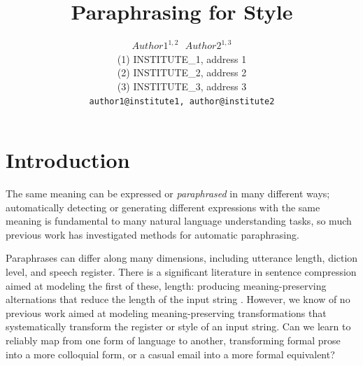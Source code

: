 \documentclass[10pt,a5paper,twoside]{article}
\title{Paraphrasing for Style}
\author{$Author1^{1, 2}~~~Author2^{1, 3}$\\
{\small  	(1) INSTITUTE\_1, address 1\\ 
 		(2) INSTITUTE\_2, address 2\\
		(3) INSTITUTE\_3, address 3\\
  \texttt{author1@institute1, author@institute2} \\ 
}}
\begin{document}
\maketitle


\newpage
\section{Introduction}

The same meaning can be expressed or \emph{paraphrased} in many different ways; automatically detecting or generating different expressions with the same meaning is 
fundamental to many natural language understanding tasks\cite{Giampiccolo07}, so much previous work has investigated methods for automatic paraphrasing\cite{Barzilay03,dolan04,Shinyama03,Das09,bannard05}.  

Paraphrases can differ along many dimensions, including utterance length, diction level, and speech register. 
There is a significant literature in sentence compression aimed at modeling the first of these, length: 
producing meaning-preserving alternations that reduce the length of the input string \cite{Chandrasekar96,Vanderwende07,Yatskar10}.
However, we know of no previous work aimed at modeling meaning-preserving transformations that systematically transform the register or style of an input string. 
Can we learn to reliably map from one form of language to another, transforming formal prose into a more colloquial form, or a casual email into a more formal equivalent?
\end{document}
